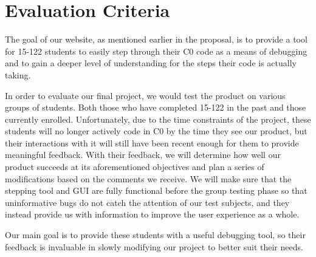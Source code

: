 \documentclass[11pt]{article}
\begin{document}
\section{Evaluation Criteria}
\par
The goal of our website, as mentioned earlier in the proposal, is to provide a
tool for 15-122 students to easily step through their C0 code as a means of
debugging and to gain a deeper level of understanding for the steps their code
is actually taking.
\par
In order to evaluate our final project, we would test the product on various
groups of students.  Both those who have completed 15-122 in the past and those
currently enrolled.  Unfortunately, due to the time constraints of the project,
these students will no longer actively code in C0 by the time they see our
product, but their interactions with it will still have been recent enough for
them to provide meaningful feedback.  With their feedback, we will determine
how well our product succeeds at its aforementioned objectives and plan a
series of modifications based on the comments we receive. We will make sure
that the stepping tool and GUI are fully functional before the group testing
phase so that uninformative bugs do not catch the attention of our test
subjects, and they instead provide us with information to improve the user
experience as a whole.
\par
Our main goal is to provide these students with a useful debugging tool, so
their feedback is invaluable in slowly modifying our project to better suit
their needs.
\end{document}
